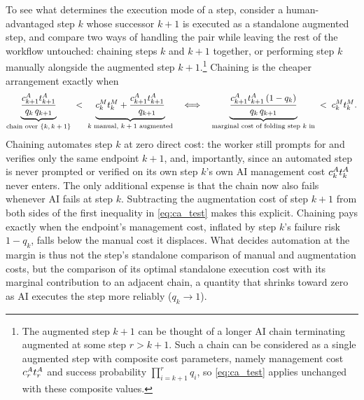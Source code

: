 To see what determines the execution mode of a step, consider a human-advantaged step $k$ whose successor $k+1$ is executed as a standalone augmented step, and compare two ways of handling the pair while leaving the rest of the workflow untouched: chaining steps $k$ and $k+1$ together, or performing step $k$ manually alongside the augmented step $k+1$.\footnote{The augmented step $k+1$ can be thought of a longer AI chain terminating augmented at some step $r > k+1$. Such a chain can be considered as a single augmented step with composite cost parameters, namely management cost $c^{A}_{r}t^{A}_{r}$ and success probability $\prod_{i=k+1}^{r} q_i$, so \eqref{eq:ca_test} applies unchanged with these composite values.}
Chaining is the cheaper arrangement exactly when
\begin{equation}
\label{eq:ca_test}
\underbrace{\frac{c^{A}_{k+1}t^{A}_{k+1}}{q_k\, q_{k+1}}}_{\text{chain over $\{k, k+1\}$}}
\;<\;
\underbrace{c^{M}_{k}t^{M}_{k} + \frac{c^{A}_{k+1}t^{A}_{k+1}}{q_{k+1}}}_{\text{$k$ manual, $k+1$ augmented}}
\quad \Longleftrightarrow \quad
\underbrace{\frac{c^{A}_{k+1}t^{A}_{k+1}\,(1-q_k)}{q_k\, q_{k+1}}}_{\text{marginal cost of folding step $k$ in}}
\;<\;
c^{M}_{k}t^{M}_{k}.
\end{equation}
Chaining automates step $k$ at zero direct cost: the worker still prompts for and verifies only the same endpoint $k+1$, and, importantly, since an automated step is never prompted or verified on its own step $k$'s own AI management cost $c^{A}_{k}t^{A}_{k}$ never enters.
The only additional expense is that the chain now also fails whenever AI fails at step $k$.
Subtracting the augmentation cost of step $k+1$ from both sides of the first inequality in \eqref{eq:ca_test} makes this explicit.
Chaining pays exactly when the endpoint's management cost, inflated by step $k$'s failure risk $1-q_k$, falls below the manual cost it displaces.
What decides automation at the margin is thus not the step's standalone comparison of manual and augmentation costs, but the comparison of its optimal standalone execution cost with its marginal contribution to an adjacent chain, a quantity that shrinks toward zero as AI executes the step more reliably ($q_k \to 1$).

